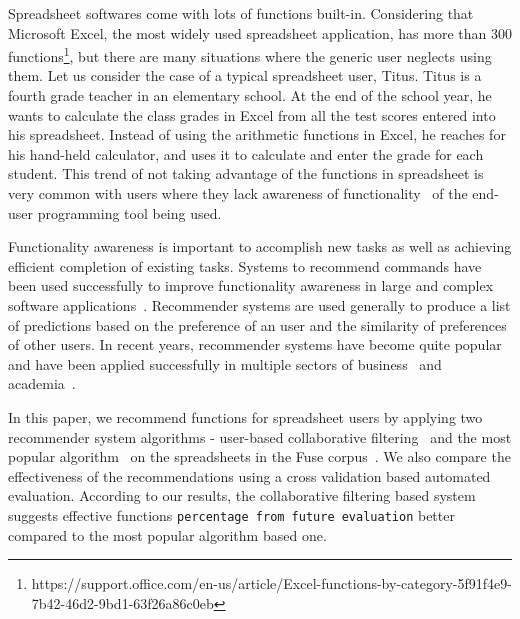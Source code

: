 \documentclass[conference]{IEEEtran}
\begin{document}
Spreadsheet softwares come with lots of functions built-in. Considering that Microsoft Excel, the most widely used spreadsheet application, has more than 300 functions\footnote{https://support.office.com/en-us/article/Excel-functions-by-category-5f91f4e9-7b42-46d2-9bd1-63f26a86c0eb}, but there are many situations where the generic user neglects using them. Let us consider the case of a typical spreadsheet user, Titus. Titus is a fourth grade teacher in an elementary school. At the end of the school year, he wants to calculate the class grades in Excel from all the test scores entered into his spreadsheet. Instead of using the arithmetic functions in Excel, he reaches for his hand-held calculator, and uses it to calculate and enter the grade for each student. This trend of not taking advantage of the functions in spreadsheet is very common with users where they lack awareness of functionality~\cite{grossman2009survey} of the end-user programming tool being used.

Functionality awareness is important to accomplish new tasks as well as achieving efficient completion of existing tasks. Systems to recommend commands have been used successfully to improve functionality awareness in large and complex software applications~\cite{matejka2009communitycommands,murphy2012improving}. Recommender systems are used generally to produce a list of predictions based on the preference of an user and the similarity of preferences of other users. In recent years, recommender systems have become quite popular and have been applied successfully in multiple sectors of business~\cite{linden2003amazon} and academia~\cite{hsu2008personalized,mcnee2006don}. 

In this paper, we recommend functions for spreadsheet users by applying two recommender system algorithms - user-based collaborative filtering~\cite{hill1995recommending} and the most popular algorithm~\cite{linton2000owl} on the spreadsheets in the Fuse corpus~\cite{barik2015fuse}. We also compare the effectiveness of the recommendations using a cross validation based automated evaluation. According to our results, the collaborative filtering based system suggests effective functions \texttt{percentage from future evaluation} better compared to the most popular algorithm based one.
\end{document}
